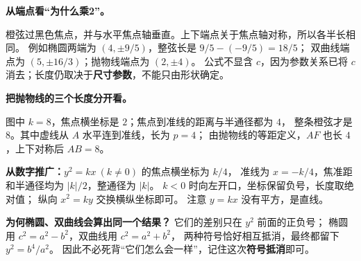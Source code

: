 \begin{explanationbox}
\textbf{从端点看“为什么乘2”。}

橙弦过黑色焦点，并与水平焦点轴垂直。上下端点关于焦点轴对称，所以各半长相同。
例如椭圆两端为 $(4,\pm9/5)$，整弦长是 $9/5-(-9/5)=18/5$；
双曲线端点为 $(5,\pm16/3)$；抛物线端点为 $(2,\pm4)$。
公式不显含 $c$，因为参数关系已将 $c$ 消去；长度仍取决于\textbf{尺寸参数}，不能只由形状确定。


\end{explanationbox}
\clearpage
\begin{explanationbox}
\textbf{把抛物线的三个长度分开看。}

图中 $k=8$，焦点横坐标是 $2$；焦点到准线的距离与半通径都为 $4$，
整条橙弦才是 $8$。其中虚线从 $A$ 水平连到准线，长为 $p=4$；
由抛物线的等距定义，$AF$ 也长 $4$，上下对称后 $AB=8$。

\textbf{从数字推广：}$y^2=kx\ (k\ne0)$ 的焦点横坐标为 $k/4$，
准线为 $x=-k/4$，焦准距和半通径均为 $|k|/2$，整通径为 $|k|$。
$k<0$ 时向左开口，坐标保留负号，长度取绝对值；
纵向 $x^2=ky$ 交换横纵坐标即可。
注意 $y=kx$ 没有平方，是直线。

\medskip
\textbf{为何椭圆、双曲线会算出同一个结果？}
它们的差别只在 $y^2$ 前面的正负号；
椭圆用 $c^2=a^2-b^2$，双曲线用 $c^2=a^2+b^2$，
两种符号恰好相互抵消，最终都留下 $y^2=b^4/a^2$。
因此不必死背“它们怎么会一样”，记住这次\textbf{符号抵消}即可。

\end{explanationbox}
\clearpage
